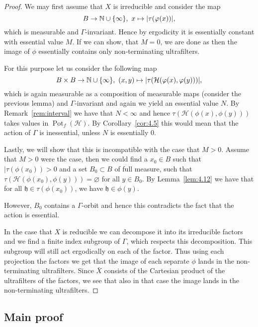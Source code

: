 \begin{proof}
  We may first assume that \(X\) is irreducible and consider the map
  \[
    B \to \mathbb{N} \cup \{\infty\},\ x \mapsto |\tau(\varphi(x))|,
  \]
  which is measurable and \(\Gamma\)-invariant. Hence by ergodicity it is essentially constant with essential value \(M\). If we can show, that \(M = 0\), we are done as then the image of \(\phi\) essentially contains only non-terminating ultrafilters.

  For this purpose let us consider the following map
  \[
    B \times B \to \mathbb{N} \cup \{\infty\},\ (x,y) \mapsto |\tau(\mathcal{H}(\varphi(x), \varphi(y)))|,
  \]
  which is again measurable as a composition of measurable maps (consider the previous lemma) and \(\Gamma\)-invariant and again we yield an essential value \(N\). By Remark~\ref{rem:interval} we have that \(N < \infty\) and hence \(\tau(\mathcal{H}(\phi(x), \phi(y)))\) takes values in \(\operatorname{Pot}_f(\mathcal{H})\). By Corollary~\ref{cor:4.5} this would mean that the action of \(\Gamma\) is inessential, unless \(N\) is essentially 0.

  Lastly, we will show that this is incompatible with the case that \(M > 0\). Assume that \(M > 0\) were the case, then we could find a \(x_0 \in B\) such that \(|\tau(\phi(x_0)) > 0\) and a set \(B_0 \subset B\) of full measure, such that \(\tau(\mathcal{H}(\phi(x_0), \phi(y))) = \varnothing\) for all \(y \in B_0\). By Lemma~\ref{lem:4.12} we have that for all \(\mathfrak{h} \in \tau(\phi(x_0))\), we have \(\mathfrak{h} \in \phi(y)\).

  However, \(B_0\) contains a \(\Gamma\)-orbit and hence this contradicts the fact that the action is essential.
  
  In the case that \(X\) is reducible we can decompose it into its irreducible factors and we find a finite index subgroup of \(\Gamma\), which respects this decomposition. This subgroup will still act ergodically on each of the factor. Thus using each projection the factors we get that the image of each separate \(\phi\) lands in the non-terminating ultrafilters. Since \(\bar X\) consists of the Cartesian product of the ultrafilters of the factors, we see that also in that case the image lands in the non-terminating ultrafilters.
\end{proof}

\subsection{Main proof}
\label{sec:main-proof}

